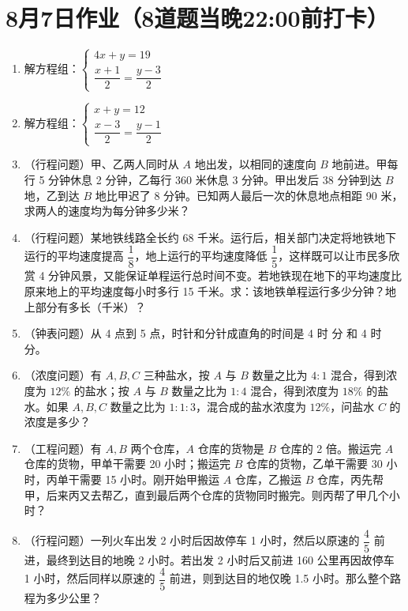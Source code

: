 \documentclass[UTF8,12pt,a4paper]{ctexart}
\newcommand{\BottomWriteSpace}{0.5cm}
\newenvironment{OnePageEightFill}{
  \small
  \vspace*{0pt}
  \begin{enumerate}[leftmargin=*, itemsep=0pt, topsep=0pt, parsep=0pt, partopsep=0pt]
  \setlength{\parskip}{0pt}
}{
  \end{enumerate}
  \vspace*{\BottomWriteSpace}
  \normalsize
  \newpage
}
\newcommand{\Q}[1]{\item #1\par\vfill}
\newcommand{\Qlast}[1]{\item #1\par}
\begin{document}
\section*{8月7日作业（8道题当晚22:00前打卡）}
\begin{OnePageEightFill}

\Q{解方程组：$\begin{cases} 4x + y = 19 \\ \dfrac{x+1}{2} = \dfrac{y-3}{2} \end{cases}$}

\Q{解方程组：$\begin{cases} x + y = 12 \\ \dfrac{x-3}{2} = \dfrac{y-1}{2} \end{cases}$}

\Q{（行程问题）甲、乙两人同时从 $A$ 地出发，以相同的速度向 $B$ 地前进。甲每行 5 分钟休息 2 分钟，乙每行 360 米休息 3 分钟。甲出发后 38 分钟到达 $B$ 地，乙到达 $B$ 地比甲迟了 8 分钟。已知两人最后一次的休息地点相距 90 米，求两人的速度均为每分钟多少米？}

\Q{（行程问题）某地铁线路全长约 68 千米。运行后，相关部门决定将地铁地下运行的平均速度提高 $\dfrac{1}{8}$，地上运行的平均速度降低 $\dfrac{1}{5}$，这样既可以让市民多欣赏 4 分钟风景，又能保证单程运行总时间不变。若地铁现在地下的平均速度比原来地上的平均速度每小时多行 15 千米。求：该地铁单程运行多少分钟？地上部分有多长（千米）？}

\Q{（钟表问题）从 4 点到 5 点，时针和分针成直角的时间是 4 时 \underline{\hspace{3em}} 分 和 4 时 \underline{\hspace{3em}} 分。}

\Q{（浓度问题）有 $A, B, C$ 三种盐水，按 $A$ 与 $B$ 数量之比为 $4:1$ 混合，得到浓度为 $12\%$ 的盐水；按 $A$ 与 $B$ 数量之比为 $1:4$ 混合，得到浓度为 $18\%$ 的盐水。如果 $A, B, C$ 数量之比为 $1:1:3$，混合成的盐水浓度为 $12\%$，问盐水 $C$ 的浓度是多少？}

\Q{（工程问题）有 $A, B$ 两个仓库，$A$ 仓库的货物是 $B$ 仓库的 2 倍。搬运完 $A$ 仓库的货物，甲单干需要 20 小时；搬运完 $B$ 仓库的货物，乙单干需要 30 小时，丙单干需要 15 小时。刚开始甲搬运 $A$ 仓库，乙搬运 $B$ 仓库，丙先帮甲，后来丙又去帮乙，直到最后两个仓库的货物同时搬完。则丙帮了甲几个小时？}

\Qlast{（行程问题）一列火车出发 2 小时后因故停车 1 小时，然后以原速的 $\dfrac{4}{5}$ 前进，最终到达目的地晚 2 小时。若出发 2 小时后又前进 160 公里再因故停车 1 小时，然后同样以原速的 $\dfrac{4}{5}$ 前进，则到达目的地仅晚 1.5 小时。那么整个路程为多少公里？}

\end{OnePageEightFill}
\end{document}
